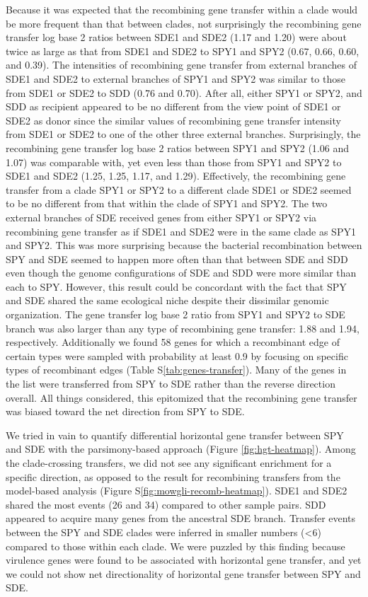\documentclass[english]{article}
\begin{document}
Because it was expected that the recombining gene transfer within a clade would
be more frequent than that between clades, not surprisingly the recombining gene
transfer log base 2 ratios between SDE1 and SDE2 (1.17 and 1.20) were about
twice as large as that from SDE1 and SDE2 to SPY1 and SPY2 (0.67, 0.66, 0.60,
and 0.39).  The intensities of recombining gene transfer from external branches
of SDE1 and SDE2 to external branches of SPY1 and SPY2 was similar to those from
SDE1 or SDE2 to SDD (0.76 and 0.70).  After all, either SPY1 or SPY2, and SDD as
recipient appeared to be no different from the view point of SDE1 or SDE2 as
donor since the similar values of recombining gene transfer intensity from SDE1
or SDE2 to one of the other three external branches. Surprisingly, the recombining
gene transfer log base 2 ratios between SPY1 and SPY2 (1.06 and 1.07) was
comparable with, yet even less than those from SPY1 and SPY2 to SDE1 and SDE2
(1.25, 1.25, 1.17, and 1.29).  Effectively, the recombining gene transfer from a
clade SPY1 or SPY2 to a different clade SDE1 or SDE2 seemed to be no different
from that within the clade of SPY1 and SPY2.  The two external branches of SDE
received genes from either SPY1 or SPY2 via recombining gene transfer as if SDE1
and SDE2 were in the same clade as SPY1 and SPY2.  This was more surprising
because the bacterial recombination between SPY and SDE seemed to happen more
often than that between SDE and SDD even though the genome configurations of SDE
and SDD were more similar than each to SPY.  However, this result could be
concordant with the fact that SPY and SDE shared the same ecological niche
despite their dissimilar genomic organization.  The gene transfer log base 2
ratio from SPY1 and SPY2 to SDE branch was also larger than any type of
recombining gene transfer: 1.88 and 1.94, respectively.  Additionally we found
58 genes for which a recombinant edge of certain types were sampled with
probability at least 0.9 by focusing on specific types of recombinant edges
(Table S\ref{tab:genes-transfer}).  Many of the genes in the list were
transferred from SPY to SDE rather than the reverse direction overall.  All
things considered, this epitomized that the recombining gene transfer was biased
toward the net direction from SPY to SDE.  

We tried in vain to quantify differential horizontal gene transfer between SPY
and SDE with the parsimony-based approach (Figure \ref{fig:hgt-heatmap}).  Among
the clade-crossing transfers, we did not see any significant enrichment for a
specific direction, as opposed to the result for recombining transfers from the
model-based analysis (Figure S\ref{fig:mowgli-recomb-heatmap}).  SDE1 and SDE2
shared the most events (26 and 34) compared to other sample pairs.  SDD appeared
to acquire many genes from the ancestral SDE branch.  Transfer events between
the SPY and SDE clades were inferred in smaller numbers (<6) compared to those
within each clade. We were puzzled by this finding because virulence
genes were found to be associated with horizontal gene transfer, and yet we could
not show net directionality of horizontal gene transfer between SPY and SDE.
\end{document}
